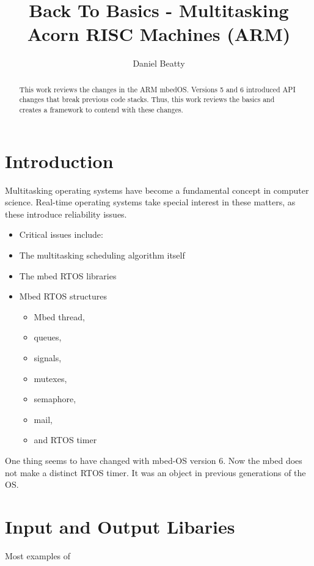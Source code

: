 \documentclass{article}
\title{Back To Basics - Multitasking Acorn RISC Machines (ARM)}
\author{Daniel Beatty}
\begin{document}
\maketitle

\begin{abstract}
    This work reviews the changes in the ARM mbedOS.  Versions 5 and 6 introduced API changes that break previous code stacks.  Thus, this work reviews the basics and creates a framework to contend with these changes.
\end{abstract}

\section{Introduction}

Multitasking operating systems have become a fundamental concept in computer science.  Real-time operating systems take special interest in these matters, as these introduce reliability issues.  

\begin{itemize}

	\item Critical issues include:

	\item The multitasking scheduling algorithm itself

	\item The mbed RTOS libraries
	\item Mbed RTOS structures
	\begin{itemize}

		\item Mbed thread,

		\item queues,

		\item signals,

		\item mutexes,

		\item semaphore,

		\item mail,

		\item and RTOS timer

	\end{itemize}
	

\end{itemize}


One thing seems to have changed with mbed-OS version 6.  Now the mbed does not make a distinct RTOS timer.  It was an object in previous generations of the OS.  

\section{Input and Output Libaries} %
\label{sec:input_and_output_libaries}
Most examples of 

\end{document}
